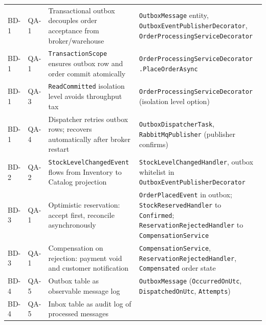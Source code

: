 {\begin{longtable}{@{} L{1.2cm} L{1.5cm} L{5.0cm} L{6.8cm} @{}}
BD-1 & QA-1 & Transactional outbox decouples order acceptance from broker/warehouse &
  \texttt{OutboxMessage} entity,\newline
  \texttt{OutboxEventPublisherDecorator},\newline
  \texttt{OrderProcessingServiceDecorator} \\
\addlinespace
BD-1 & QA-1 & \texttt{TransactionScope} ensures outbox row and order commit atomically &
  \texttt{OrderProcessingServiceDecorator}\newline
  \texttt{.PlaceOrderAsync} \\
\addlinespace
BD-1 & QA-3 & \texttt{ReadCommitted} isolation level avoids throughput tax &
  \texttt{OrderProcessingServiceDecorator}\newline
  (isolation level option) \\
\addlinespace
BD-1 & QA-4 & Dispatcher retries outbox rows; recovers automatically after broker restart &
  \texttt{OutboxDispatcherTask},\newline
  \texttt{RabbitMqPublisher} (publisher confirms) \\
\addlinespace
BD-2 & QA-2 & \texttt{StockLevelChangedEvent} flows from Inventory to Catalog projection &
  \texttt{StockLevelChangedHandler},\newline
  outbox whitelist in\newline
  \texttt{OutboxEventPublisherDecorator} \\
\addlinespace
BD-3 & QA-1 & Optimistic reservation: accept first, reconcile asynchronously &
  \texttt{OrderPlacedEvent} in outbox;\newline
  \texttt{StockReservedHandler} to \texttt{Confirmed};\newline
  \texttt{ReservationRejectedHandler} to\newline
  \texttt{CompensationService} \\
\addlinespace
BD-3 & QA-1 & Compensation on rejection: payment void and customer notification &
  \texttt{CompensationService},\newline
  \texttt{ReservationRejectedHandler},\newline
  \texttt{Compensated} order state \\
\addlinespace
BD-4 & QA-5 & Outbox table as observable message log &
  \texttt{OutboxMessage}\newline
  (\texttt{OccurredOnUtc}, \texttt{DispatchedOnUtc}, \texttt{Attempts}) \\
\addlinespace
BD-4 & QA-5 & Inbox table as audit log of processed messages &

\end{longtable}}
